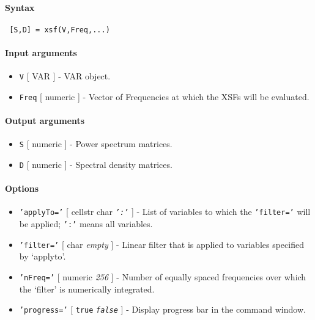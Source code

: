 


	\paragraph{Syntax}
 
 \begin{verbatim}
 [S,D] = xsf(V,Freq,...)
 \end{verbatim}
 
 \paragraph{Input arguments}
 
 \begin{itemize}
 \item
   \texttt{V} {[} VAR {]} - VAR object.
 \item
   \texttt{Freq} {[} numeric {]} - Vector of Frequencies at which the
   XSFs will be evaluated.
 \end{itemize}
 
 \paragraph{Output arguments}
 
 \begin{itemize}
 \item
   \texttt{S} {[} numeric {]} - Power spectrum matrices.
 \item
   \texttt{D} {[} numeric {]} - Spectral density matrices.
 \end{itemize}
 
 \paragraph{Options}
 
 \begin{itemize}
 \item
   \texttt{'applyTo='} {[} cellstr \textbar{} char \textbar{}
   \emph{\texttt{':'}} {]} - List of variables to which the
   \texttt{'filter='} will be applied; \texttt{':'} means all variables.
 \item
   \texttt{'filter='} {[} char \textbar{} \emph{empty} {]} - Linear
   filter that is applied to variables specified by `applyto'.
 \item
   \texttt{'nFreq='} {[} numeric \textbar{} \emph{256} {]} - Number of
   equally spaced frequencies over which the `filter' is numerically
   integrated.
 \item
   \texttt{'progress='} {[} \texttt{true} \textbar{}
   \emph{\texttt{false}} {]} - Display progress bar in the command
   window.
 \end{itemize}
 
